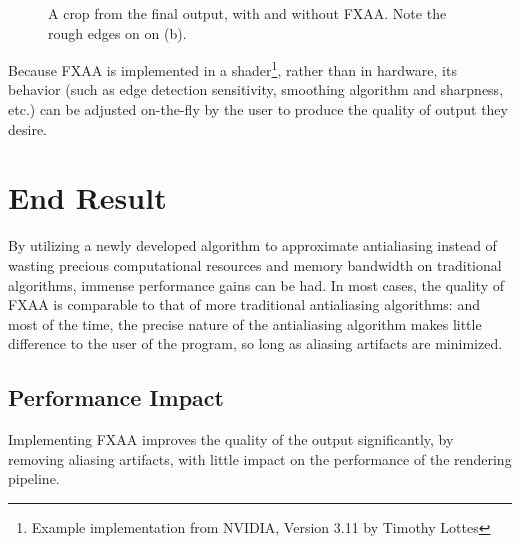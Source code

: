 \documentclass[11pt, oneside]{report}
\begin{document}
\begin{figure}[!htbp]
  \centering
  \hfill
  \caption{A crop from the final output, with and without FXAA. Note the rough edges on on (b).}
\end{figure}

Because \gls{FXAA} is implemented in a shader\footnote{Example implementation from NVIDIA, Version 3.11 by Timothy Lottes}, rather than in hardware, its behavior (such as edge detection sensitivity, smoothing algorithm and sharpness, etc.) can be adjusted on-the-fly by the user to produce the quality of output they desire.

\section{End Result}
By utilizing a newly developed algorithm to approximate antialiasing instead of wasting precious computational resources and \gls{memory bandwidth} on traditional algorithms, immense performance gains can be had. In most cases, the quality of \gls{FXAA} is comparable to that of more traditional antialiasing algorithms: and most of the time, the precise nature of the antialiasing algorithm makes little difference to the user of the program, so long as \gls{aliasing} artifacts are minimized.

\subsection{Performance Impact}
Implementing \gls{FXAA} improves the quality of the output significantly, by removing \gls{aliasing} artifacts, with little impact on the performance of the rendering pipeline.
\end{document}
